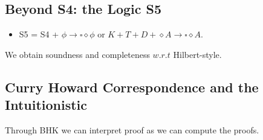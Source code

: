 \documentclass[a4paper]{article}
\begin{document}
\subsection{Beyond S4: the Logic S5}

\begin{itemize}
    \item S5 = S4 + $\phi \rightarrow \square \diamond \phi \text{ or } K + T + D + \diamond A \rightarrow \square \diamond A$.
\end{itemize}
We obtain soundness and completeness $w.r.t$ Hilbert-style.

\subsection{Curry Howard Correspondence and the Intuitionistic}

Through BHK we can interpret proof as we can compute the proofs.
\end{document}
